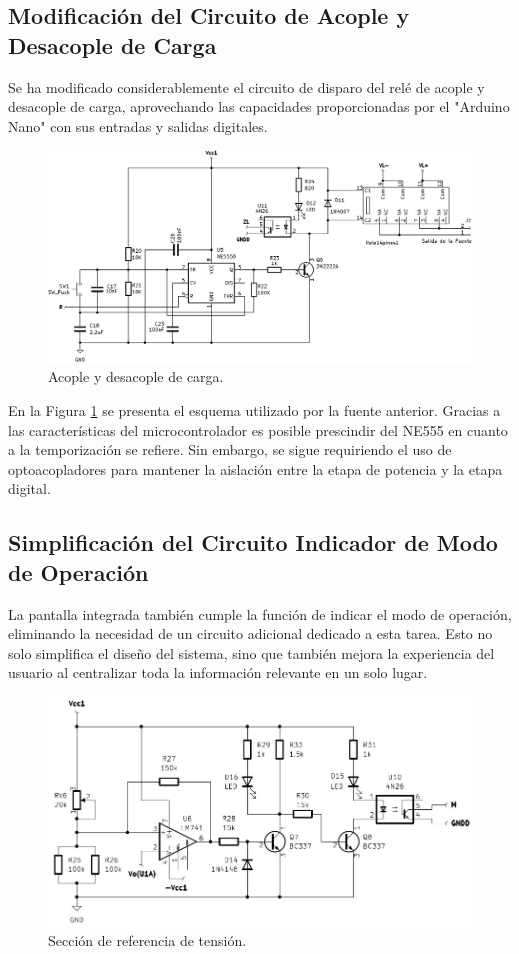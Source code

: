 \subsection{Modificación del Circuito de Acople y Desacople de Carga}\par 
Se ha modificado considerablemente el circuito de disparo del relé de acople y desacople de carga, aprovechando las capacidades proporcionadas por el "Arduino Nano" con sus entradas y salidas digitales.
\begin{figure}[H]
    \centering
    \includegraphics[scale=0.3]{./imagenes/conexion_carga.jpg}
    \caption{Acople y desacople de carga.}
    \label{F:conexion_carga}
\end{figure}\par 
En la Figura \ref{F:conexion_carga} se presenta el esquema utilizado por la fuente anterior. Gracias a las características del microcontrolador es posible prescindir del NE555 en cuanto a la temporización se refiere. Sin embargo, se sigue requiriendo el uso de optoacopladores para mantener la aislación entre la etapa de potencia y la etapa digital.

\subsection{Simplificación del Circuito Indicador de Modo de Operación}
La pantalla integrada también cumple la función de indicar el modo de operación, eliminando la necesidad de un circuito adicional dedicado a esta tarea. Esto no solo simplifica el diseño del sistema, sino que también mejora la experiencia del usuario al centralizar toda la información relevante en un solo lugar.
\begin{figure}[H]
    \centering
    \includegraphics[scale=0.5]{./imagenes/modo_operacion.jpg}
    \caption{Sección de referencia de tensión.}
    \label{F:modo_operacion}
\end{figure}

